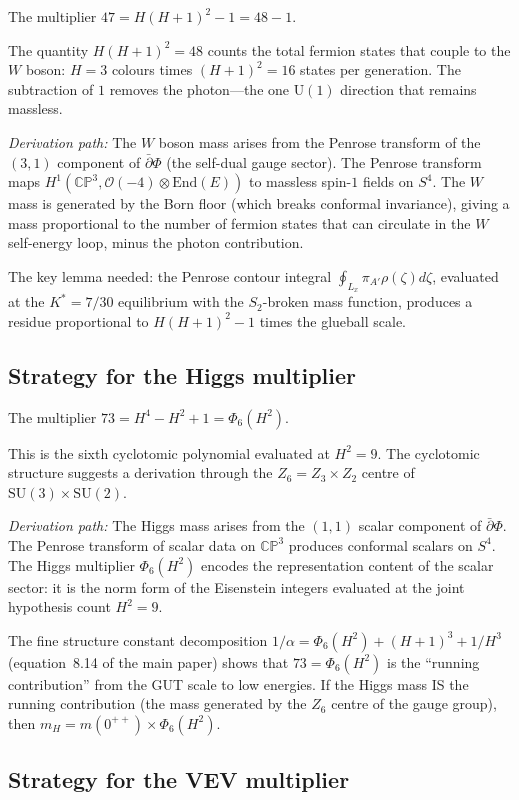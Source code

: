 \documentclass[11pt,a4paper]{article}
\theoremstyle{definition}
\theoremstyle{remark}
\newcommand{\CP}{\mathbb{CP}}
\newcommand{\dbar}{\bar{\partial}}
\newcommand{\SU}{\mathrm{SU}}
\newcommand{\U}{\mathrm{U}}
\begin{document}
The multiplier $47 = H(H+1)^2 - 1 = 48 - 1$.

The quantity $H(H+1)^2 = 48$ counts the total fermion states that couple to the $W$ boson: $H = 3$ colours times $(H+1)^2 = 16$ states per generation. The subtraction of $1$ removes the photon---the one $\U(1)$ direction that remains massless.

\emph{Derivation path:} The $W$ boson mass arises from the Penrose transform of the $(3,1)$ component of $\dbar\Phi$ (the self-dual gauge sector). The Penrose transform maps $H^1(\CP^3, \mathcal{O}(-4) \otimes \mathrm{End}(E))$ to massless spin-$1$ fields on $S^4$. The $W$ mass is generated by the Born floor (which breaks conformal invariance), giving a mass proportional to the number of fermion states that can circulate in the $W$ self-energy loop, minus the photon contribution.

The key lemma needed: the Penrose contour integral $\oint_{L_x} \pi_{A'} \rho(\zeta) d\zeta$, evaluated at the $K^* = 7/30$ equilibrium with the $S_2$-broken mass function, produces a residue proportional to $H(H+1)^2 - 1$ times the glueball scale.

\subsection{Strategy for the Higgs multiplier}\label{sec:Higgs_strategy}

The multiplier $73 = H^4 - H^2 + 1 = \Phi_6(H^2)$.

This is the sixth cyclotomic polynomial evaluated at $H^2 = 9$. The cyclotomic structure suggests a derivation through the $Z_6 = Z_3 \times Z_2$ centre of $\SU(3) \times \SU(2)$.

\emph{Derivation path:} The Higgs mass arises from the $(1,1)$ scalar component of $\dbar\Phi$. The Penrose transform of scalar data on $\CP^3$ produces conformal scalars on $S^4$. The Higgs multiplier $\Phi_6(H^2)$ encodes the representation content of the scalar sector: it is the norm form of the Eisenstein integers evaluated at the joint hypothesis count $H^2 = 9$.

The fine structure constant decomposition $1/\alpha = \Phi_6(H^2) + (H+1)^3 + 1/H^3$ (equation~8.14 of the main paper) shows that $73 = \Phi_6(H^2)$ is the ``running contribution'' from the GUT scale to low energies. If the Higgs mass IS the running contribution (the mass generated by the $Z_6$ centre of the gauge group), then $m_H = m(0^{++}) \times \Phi_6(H^2)$.

\subsection{Strategy for the VEV multiplier}\label{sec:VEV_strategy}
\end{document}
